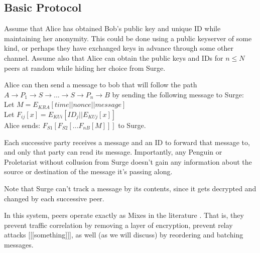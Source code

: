 \documentclass[twocolumn,11pt,english]{paper}
\begin{document}
\subsection{Basic Protocol}
Assume that Alice has obtained Bob's public key and unique ID while maintaining her anonymity. This could be done using a public keyserver of some kind, or perhaps they have exchanged keys in advance through some other channel. Assume also that Alice can obtain the public keys and IDs for $n \le N$ peers at random while hiding her choice from Surge. 

Alice can then send a message to bob that will follow the path $A \rightarrow P_1 \rightarrow S \rightarrow ... \rightarrow S \rightarrow P_n \rightarrow B$ by sending the following message to Surge: 
\\
Let $M = E_{KRA}[  time || nonce || message ]$
\\Let $F_{ij}[x] = E_{KUi}[ ID_j || E_{KUj}[ x ] ]$
\\
Alice sends: $F_{S1}[F_{S2}[...F_{nB}[ M ]]]$ to Surge. 

Each successive party receives a message and an ID to forward that message to, and only that party can read its message. Importantly, any Penguin or Proletariat without collusion from Surge doesn't gain any information about the source or destination of the message it's passing along. 

Note that Surge can't track a message by its contents, since it gets decrypted and changed by each successive peer. 

In this system, peers operate exactly as Mixes in the literature \cite{chaum-mix} . That is, they prevent traffic correlation by removing a layer of encryption, prevent relay attacks [[[something]]], as well (as we will discuss) by reordering and batching messages. 
\end{document}
